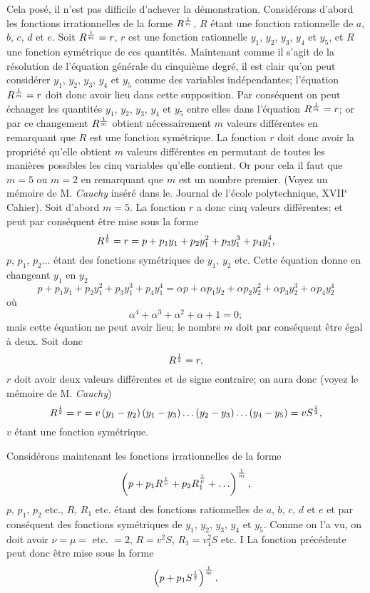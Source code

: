 \documentclass[oneside, 12 pt, leqno]{memoir}
\let\oldfrac\frac
\def\frac#1#2{\mathchoice{\text{\scalebox{.83}{${\oldfrac{#1}{#2}}$}}}{\text{\scalebox{.83}{${\displaystyle\oldfrac{#1}{#2}}$}}}{\genfrac{}{}{}{2}{#1}{#2}}{\genfrac{}{}{}{3}{#1}{#2}}}
\begin{document}
Cela posé, il n'est pas difficile d'achever la démonstration. Considérons d'abord les fonctions irrationnelles de la forme \(R^{\frac{1}{m}}\), \(R\) étant une fonction rationnelle de \(a\), \(b\), \(c\), \(d\) et \(e\). Soit \(R^{\frac{1}{m}}=r\), \(r\) est une fonction rationnelle \(y_1\), \(y_2\), \(y_3\), \(y_4\) et \(y_5\), et \(R\) une fonction symétrique de ces quantités. Maintenant comme il s'agit de la résolution de l'équation générale du cinquième degré, il est clair qu'on peut considérer \(y_1\), \(y_2\), \(y_3\), \(y_4\) et \(y_5\) comme des variables indépendantes; l'équation \(R^{\frac{1}{m}}=r\) doit donc avoir lieu dans cette supposition. Par conséquent on peut échanger les quantités \(y_1\), \(y_2\), \(y_3\), \(y_4\) et \(y_5\) entre elles dans l'équation \(R^{\frac{1}{m}}=r\); or par ce changement \(R^{\frac{1}{m}}\) obtient nécessairement \(m\) valeurs différentes en remarquant que \(R\) est une fonction symétrique. La fonction \(r\) doit donc avoir la propriété qu'elle obtient \(m\) valeurs différentes en permutant de toutes les manières possibles les cinq variables qu'elle contient. Or pour cela il faut que \(m=5\) ou \(m=2\) en remarquant que \(m\) est un nombre premier. (Voyez un mémoire de M. \textit{Cauchy} inséré dans le. Journal de l'école polytechnique, XVII\(^{e}\) Cahier). Soit d'abord \(m=5\). La fonction \(r\) a donc cinq valeurs différentes; et peut par conséquent être mise sous la forme
\[R^{\frac{1}{5}}=r=p+p_1 y_1+p_2 y_1^2+p_3 y_1^3+p_4 y_1^4,\]
\(p\), \(p_1\), \(p_2 \ldots\) étant des fonctions symétriques de \(y_1\), \(y_2\) etc. Cette équation donne en changeant \(y_1\) en \(y_2\)
\[p+p_1 y_1+p_2 y_1^2+p_3 y_1^3+p_4 y_1^4=\alpha p+\alpha p_1 y_2+\alpha p_2 y_2^2+\alpha p_3 y_2^3+\alpha p_4 y_2^4\]
où
\[\alpha^4+\alpha^3+\alpha^2+\alpha+1=0;\]
mais cette équation ne peut avoir lieu; le nombre \(m\) doit par conséquent être égal à deux. Soit donc
\[R^{\frac{1}{2}}=r,\]
\(r\) doit avoir deux valeurs différentes et de signe contraire; on aura donc (voyez le mémoire de M. \textit{Cauchy})
\[R^{\frac{1}{2}}=r=v\left(y_1-y_2\right)\left(y_1-y_3\right) \ldots\left(y_2-y_3\right) \ldots\left(y_4-y_5\right)=v S^{\frac{1}{2}},\]
\(v\) étant une fonction symétrique. 

Considérons maintenant les fonctions irrationnelles de la forme
\[\left(p+p_1 R^{\frac{1}{\nu}}+p_2 R_1^{\frac{1}{\mu}}+\ldots\right)^{\frac{1}{m}},\]
\(p\), \(p_1\), \(p_2\) etc., \(R\), \(R_1\) etc. étant des fonctions rationnelles de \(a\), \(b\), \(c\), \(d\) et \(e\) et par conséquent des fonctions symétriques de \(y_1\), \(y_2\), \(y_3\), \(y_4\) et \(y_5\). Comme on l'a vu, on doit avoir \(\nu=\mu=\) etc. \(=2\), \(R=v^2 S\), \(R_1=v_1^2 S\) etc. I La fonction précédente peut donc être mise sous la forme
\[\left(p+p_1 S^{\frac{1}{2}}\right)^{\frac{1}{m}}.\]
\end{document}
